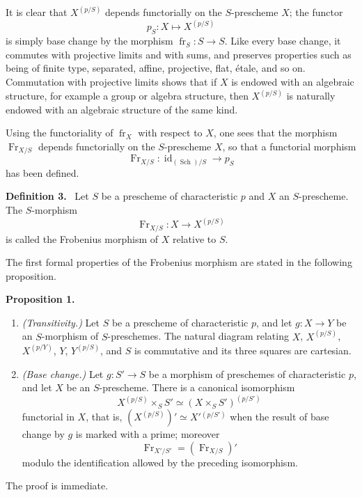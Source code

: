 \documentclass[11pt]{article}
\newenvironment{statement}[1]{\par\medskip\noindent\textbf{#1.}\ }{\par\medskip}
\providecommand{\id}{\operatorname{id}}
\providecommand{\id}{\operatorname{id}}
\providecommand{\id}{\operatorname{id}}
\providecommand{\id}{\operatorname{id}}
\providecommand{\id}{\operatorname{id}}
\providecommand{\fr}{\operatorname{fr}}
\providecommand{\Fr}{\operatorname{Fr}}
\providecommand{\Sch}{\operatorname{Sch}}
\providecommand{\Fr}{\operatorname{Fr}}
\providecommand{\fr}{\operatorname{fr}}
\providecommand{\Sch}{\operatorname{Sch}}
\providecommand{\id}{\operatorname{id}}
\begin{document}
It is clear that $X^{(p/S)}$ depends functorially on the $S$-prescheme $X$; the functor
\[
p_S:X\longmapsto X^{(p/S)}
\]
is simply base change by the morphism $\fr_S:S\to S$. Like every base change, it commutes with projective limits and with sums, and preserves properties such as being of finite type, separated, affine, projective, flat, étale, and so on. Commutation with projective limits shows that if $X$ is endowed with an algebraic structure, for example a group or algebra structure, then $X^{(p/S)}$ is naturally endowed with an algebraic structure of the same kind.

Using the functoriality of $\fr_X$ with respect to $X$, one sees that the morphism $\Fr_{X/S}$ depends functorially on the $S$-prescheme $X$, so that a functorial morphism
\[
\Fr_{X/S}:\id_{(\Sch)/S}\longrightarrow p_S
\]
has been defined.

\begin{statement}{Definition 3}
Let $S$ be a prescheme of characteristic $p$ and $X$ an $S$-prescheme. The $S$-morphism
\[
\Fr_{X/S}:X\longrightarrow X^{(p/S)}
\]
is called the Frobenius morphism of $X$ relative to $S$.
\end{statement}

The first formal properties of the Frobenius morphism are stated in the following proposition.

\begin{statement}{Proposition 1}
\begin{enumerate}[label=\alph*)]
\item \emph{(Transitivity.)} Let $S$ be a prescheme of characteristic $p$, and let $g:X\to Y$ be an $S$-morphism of $S$-preschemes. The natural diagram relating $X$, $X^{(p/S)}$, $X^{(p/Y)}$, $Y$, $Y^{(p/S)}$, and $S$ is commutative and its three squares are cartesian.

\item \emph{(Base change.)} Let $g:S'\to S$ be a morphism of preschemes of characteristic $p$, and let $X$ be an $S$-prescheme. There is a canonical isomorphism
\[
X^{(p/S)}\times_S S'\simeq (X\times_S S')^{(p/S')}
\]
functorial in $X$, that is, $(X^{(p/S)})'\simeq X'{}^{(p/S')}$ when the result of base change by $g$ is marked with a prime; moreover
\[
\Fr_{X'/S'}=(\Fr_{X/S})'
\]
modulo the identification allowed by the preceding isomorphism.
\end{enumerate}
\end{statement}

The proof is immediate.
\end{document}
